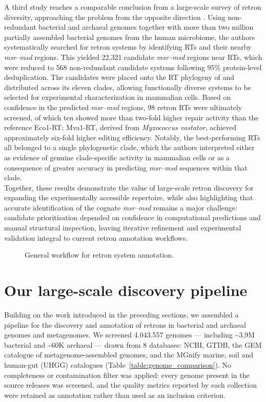 A third study reaches a comparable conclusion from a large-scale survey of retron diversity, approaching the problem from the opposite direction \cite{buffington2025}. Using non-redundant bacterial and archaeal genomes together with more than two million partially assembled bacterial genomes from the human microbiome, the authors systematically searched for retron systems by identifying RTs and their nearby \textit{msr--msd} regions. This yielded 22,321 candidate \textit{msr--msd} regions near RTs, which were reduced to 568 non-redundant candidate systems following 95\% protein-level deduplication. The candidates were placed onto the RT phylogeny of \cite{mestre2020} and distributed across its eleven clades, allowing functionally diverse systems to be selected for experimental characterization in mammalian cells. Based on confidence in the predicted \textit{msr--msd} regions, 98 retron RTs were ultimately screened, of which ten showed more than two-fold higher repair activity than the reference Eco1-RT; Mva1-RT, derived from \textit{Myxococcus vastator}, achieved approximately six-fold higher editing efficiency. Notably, the best-performing RTs all belonged to a single phylogenetic clade, which the authors interpreted either as evidence of genuine clade-specific activity in mammalian cells or as a consequence of greater accuracy in predicting \textit{msr--msd} sequences within that clade.
\\
Together, these results demonstrate the value of large-scale retron discovery for expanding the experimentally accessible repertoire, while also highlighting that accurate identification of the cognate \textit{msr--msd} remains a major challenge: candidate prioritisation depended on confidence in computational predictions and manual structural inspection, leaving iterative refinement and experimental validation integral to current retron annotation workflows.


\begin{figure}[H]
  \centering
  \resizebox{\textwidth}{!}{}
  \caption{General workflow for retron system annotation.}
  \label{fig:retron-workflow}
\end{figure}



\section{Our large-scale discovery pipeline}
\label{sec:discovery-pipeline}

Building on the work introduced in the preceding sections, we assembled a pipeline
for the discovery and annotation of retrons in bacterial and archaeal genomes and
metagenomes. We screened \num{4,043,557} genomes --- including \num{~3,9M} bacterial and \num{~60K}
archaeal --- drawn from 8 databases: NCBI, GTDB, the GEM catalogue of
metagenome-assembled genomes, and the MGnify marine, soil and human-gut (UHGG)
catalogues (Table~\ref{table:genome_comparison}). No completeness or contamination
filter was applied: every genome present in the source releases was screened, and
the quality metrics reported by each collection were retained as annotation rather
than used as an inclusion criterion.


